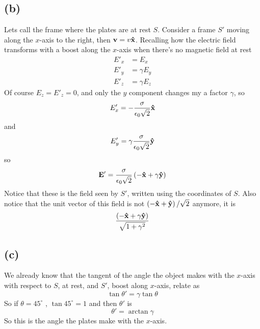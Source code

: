 \documentclass[oneside, 10pt, notitlepage]{book}
\begin{document}
\subsection*{(b)}
Lets call the frame where the plates are at rest \(S\). Consider a frame \(S'\) moving along the \(x\)-axis to the right, then \(\vb{v}=v\vu{x}\). Recalling how the electric field transforms with a boost along the \(x\)-axis when there's no magnetic field at rest
\begin{equation}
\begin{split}
    E'_x &= E_x \\
    E'_y &= \gamma E_y \\
    E'_z &= \gamma E_z
\end{split}
\end{equation}
Of course \(E_z=E'_z=0\), and only the \(y\) component changes my a factor \(\gamma\), so
\begin{equation}
    E'_x = -\frac{\sigma}{\epsilon_0\sqrt{2}}\vu{x}
\end{equation}
and
\begin{equation}
    E'_y = \gamma \frac{\sigma}{\epsilon_0\sqrt{2}} \vu{y}
\end{equation}
so 
\begin{equation}
    \vb{E}' = \frac{\sigma}{\epsilon_0\sqrt{2}}\left(-\vu{x}+\gamma\vu{y}\right)
\end{equation}
Notice that these is the field seen by \(S'\), written using the coordinates of \(S\). Also notice that the unit vector of this field is not \(\left(-\vu{x}+\vu{y}\right)/\sqrt{2}\) anymore, it is 
\begin{equation}
    \frac{\left(-\vu{x}+\gamma\vu{y}\right)}{\sqrt{1+\gamma^2}}
\end{equation}

\subsection*{(c)}
We already know that the tangent of the angle the object makes with the \(x\)-axis with respect to \(S\), at rest, and \(S'\), boost along \(x\)-axis, relate as
\begin{equation}
    \tan \theta' = \gamma \tan \theta
\end{equation}
So if \(\theta=45^{\circ}\) , \(\tan 45^{\circ} = 1\) and then \(\theta'\) is
\begin{equation}
    \theta' = \arctan \gamma
\end{equation}
So this is the angle the plates make with the \(x\)-axis.
\end{document}
